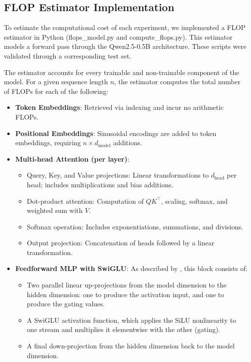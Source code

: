 \documentclass[a4paper,12pt]{article}
\begin{document}
\subsection*{FLOP Estimator Implementation}

To estimate the computational cost of each experiment, we implemented a FLOP estimator in Python (flops\_model.py and compute\_flops.py). This estimator models a forward pass through the Qwen2.5-0.5B architecture. These scripts were validated through a corresponding test set.

The estimator accounts for every trainable and non-trainable component of the model. For a given sequence length $n$, the estimator computes the total number of FLOPs for each of the following:

\begin{itemize}
  \item \textbf{Token Embeddings}: Retrieved via indexing and incur no arithmetic FLOPs.
  
  \item \textbf{Positional Embeddings}: Sinusoidal encodings are added to token embeddings, requiring $n \times d_{\text{model}}$ additions.

  \item \textbf{Multi-head Attention (per layer)}:
  \begin{itemize}
    \item Query, Key, and Value projections: Linear transformations to $d_{\text{head}}$ per head; includes multiplications and bias additions.
    \item Dot-product attention: Computation of $QK^\top$, scaling, softmax, and weighted sum with $V$.
    \item Softmax operation: Includes exponentiations, summations, and divisions.
    \item Output projection: Concatenation of heads followed by a linear transformation.
  \end{itemize}

  \item \textbf{Feedforward MLP with SwiGLU}: As described by \citet{shazeer2020glu}, this block consists of:
  \begin{itemize}
    \item Two parallel linear up-projections from the model dimension to the hidden dimension: one to produce the activation input, and one to produce the gating values.
    \item A SwiGLU activation function, which applies the SiLU nonlinearity to one stream and multiplies it elementwise with the other (gating).
    \item A final down-projection from the hidden dimension back to the model dimension.
  \end{itemize}  


\end{itemize}
\end{document}
